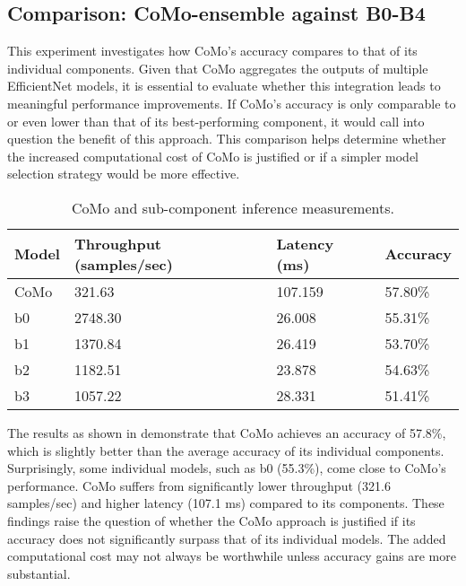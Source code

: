 \subsection{Comparison: CoMo-ensemble against B0-B4}\label{sec:experiments:exp3}

This experiment investigates how CoMo's accuracy compares to that of its individual components. Given that CoMo aggregates the outputs of multiple EfficientNet models, it is essential to evaluate whether this integration leads to meaningful performance improvements. If CoMo’s accuracy is only comparable to or even lower than that of its best-performing component, it would call into question the benefit of this approach. This comparison helps determine whether the increased computational cost of CoMo is justified or if a simpler model selection strategy would be more effective.

\begin{table}[t]
\centering
\caption{CoMo and sub-component inference measurements.}
\label{tab:eval:como-inference}
\begin{tabularx}{\linewidth} {XXXX}
    \toprule
    Model & Throughput (samples/sec) & Latency (ms) & Accuracy  \\
    \midrule
     CoMo  & 321.63                   & 107.159       & 57.80\% \\
b0    & 2748.30                  & 26.008        & 55.31\% \\
b1    & 1370.84                  & 26.419        & 53.70\% \\
b2    & 1182.51                  & 23.878        & 54.63\% \\
b3    & 1057.22                  & 28.331        & 51.41\%     \\
    \bottomrule
\end{tabularx}
\end{table}


The results as shown in  demonstrate that CoMo achieves an accuracy of 57.8\%, which is slightly better than the average accuracy of its individual components. Surprisingly, some individual models, such as b0 (55.3\%), come close to CoMo's performance. CoMo suffers from significantly lower throughput (321.6 samples/sec) and higher latency (107.1 ms) compared to its components. These findings raise the question of whether the CoMo approach is justified if its accuracy does not significantly surpass that of its individual models. The added computational cost may not always be worthwhile unless accuracy gains are more substantial.

